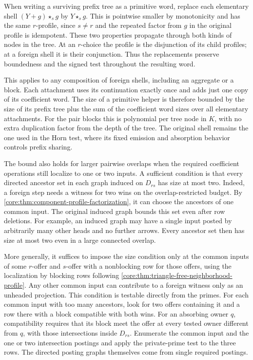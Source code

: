 When writing a surviving prefix tree as a primitive word,
replace each elementary shell $(Y+g)\star_s g$ by
$Y\star_s g$. This is pointwise smaller by monotonicity
and has the same $r$-profile, since $s\ne r$ and the
repeated factor from $g$ in the original profile is
idempotent. These two properties propagate through
both kinds of nodes in the tree. At an $r$-choice the
profile is the disjunction of its child profiles; at
a foreign shell it is their conjunction. Thus the
replacements preserve boundedness and the signed
test throughout the resulting word.

This applies to any composition of foreign shells,
including an aggregate or a block. Each attachment
uses its continuation exactly once and adds just
one copy of its coefficient word. The size of a
primitive helper is therefore bounded by the size
of its prefix tree plus the sum of the coefficient
word sizes over all elementary attachments. For
the pair blocks this is polynomial per tree node
in $K$, with no extra duplication factor from
the depth of the tree. The original shell remains
the one used in the Horn test, where its fixed
emission and absorption behavior controls prefix
sharing.

The bound also holds for larger pairwise overlaps when
the required coefficient operations still localize to
one or two inputs. A sufficient condition is that every
directed ancestor set in each graph induced on $D_{rs}$
has size at most two. Indeed, a foreign step needs a
witness for two wins on the overlap-restricted budget.
By \cref{core:thm:component-profile-factorization}, it
can choose the ancestors of one common input. The
original induced graph bounds this set even after row
deletions. For example, an induced graph may have a
single input posted by arbitrarily many other heads
and no further arrows. Every ancestor set then has
size at most two even in a large connected overlap.

More generally, it suffices to impose the size condition
only at the common inputs of some $r$-offer and $s$-offer
with a nonblocking row for those offers, using the
localization by blocking rows following
\cref{core:thm:triangle-free-neighborhood-profile}.
Any other common input can contribute to a foreign
witness only as an unheaded projection. This condition
is testable directly from the primes. For each common
input with too many ancestors, look for two offers
containing it and a row there with a block compatible
with both wins. For an absorbing owner $q$, compatibility
requires that its block meet the offer at every tested
owner different from $q$, with those intersections
inside $D_{rs}$. Enumerate the common input and the
one or two intersection postings and apply the
private-prime test to the three rows. The directed
posting graphs themselves come from single required
postings.

